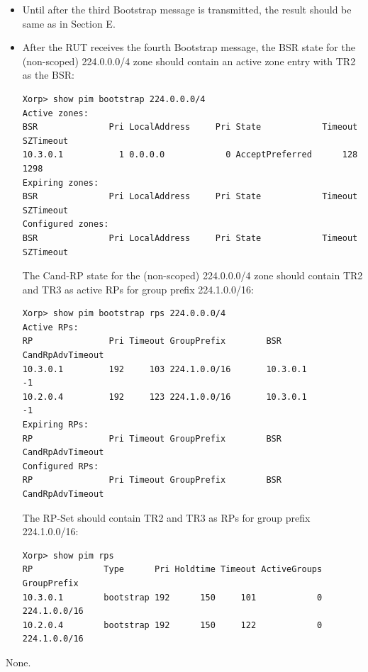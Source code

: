 \documentclass[11pt]{report}
\begin{document}
\begin{itemize}

  \item Until after the third Bootstrap message is transmitted, the result
  should be same as in Section E.

  \item After the RUT receives the fourth Bootstrap message, the BSR state for
  the (non-scoped) 224.0.0.0/4 zone should contain an active zone entry with
  TR2 as the BSR:

\begin{verbatim}
Xorp> show pim bootstrap 224.0.0.0/4
Active zones:
BSR              Pri LocalAddress     Pri State            Timeout SZTimeout
10.3.0.1           1 0.0.0.0            0 AcceptPreferred      128      1298
Expiring zones:
BSR              Pri LocalAddress     Pri State            Timeout SZTimeout
Configured zones:
BSR              Pri LocalAddress     Pri State            Timeout SZTimeout
\end{verbatim}

  The Cand-RP state for the (non-scoped) 224.0.0.0/4 zone should
  contain TR2 and TR3 as active RPs for group prefix 224.1.0.0/16:

\begin{verbatim}
Xorp> show pim bootstrap rps 224.0.0.0/4
Active RPs:
RP               Pri Timeout GroupPrefix        BSR         CandRpAdvTimeout
10.3.0.1         192     103 224.1.0.0/16       10.3.0.1                  -1
10.2.0.4         192     123 224.1.0.0/16       10.3.0.1                  -1
Expiring RPs:
RP               Pri Timeout GroupPrefix        BSR         CandRpAdvTimeout
Configured RPs:
RP               Pri Timeout GroupPrefix        BSR         CandRpAdvTimeout
\end{verbatim}

  The RP-Set should contain TR2 and TR3 as RPs for group prefix 224.1.0.0/16:

\begin{verbatim}
Xorp> show pim rps 
RP              Type      Pri Holdtime Timeout ActiveGroups GroupPrefix       
10.3.0.1        bootstrap 192      150     101            0 224.1.0.0/16      
10.2.0.4        bootstrap 192      150     122            0 224.1.0.0/16      
\end{verbatim}

\end{itemize}

None.

\end{document}
